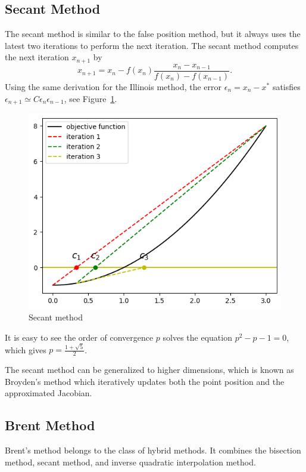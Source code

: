 \subsection{Secant Method}
\label{SSec: 0-SE-ME}
The secant method is similar to the false position method, but it always uses the latest two iterations to perform the next iteration. The secant method computes the next iteration $x_{n+1}$ by
$$
x_{n+1} = x_n - f(x_n)\frac{x_n - x_{n-1}}{f(x_n) - f(x_{n-1})}.
$$
Using the same derivation for the Illinois method, the error $\epsilon_{n} = x_n - x^{\ast}$ satisfies $\epsilon_{n+1} \simeq C \epsilon_{n}\epsilon_{n-1}$, see Figure~\ref{FIG: 0-RO-FI-SE}.
\begin{figure}[!htb]
    \centering
    \includegraphics[scale=0.6]{Figures/root_finding_img_3.png}
    \caption{Secant method}
    \label{FIG: 0-RO-FI-SE}
\end{figure}
It is easy to see the order of convergence $p$ solves the equation $p^2 - p - 1 = 0$, which gives $p = \frac{1 + \sqrt{5}}{2}$.
\begin{remark}
    The secant method can be generalized to higher dimensions, which is known as Broyden's method which iteratively updates both the point position and the approximated Jacobian. 
\end{remark}
\subsection{Brent Method}
Brent's method belongs to the class of hybrid methods. It combines the bisection method, secant method, and inverse quadratic interpolation method. 

